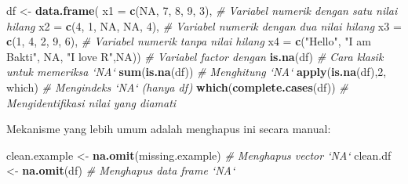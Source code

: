 \documentclass[
]{book}
\newenvironment{Shaded}{\begin{snugshade}}{\end{snugshade}}
\newcommand{\CommentTok}[1]{\textcolor[rgb]{0.56,0.35,0.01}{\textit{#1}}}
\newcommand{\DataTypeTok}[1]{\textcolor[rgb]{0.13,0.29,0.53}{#1}}
\newcommand{\DecValTok}[1]{\textcolor[rgb]{0.00,0.00,0.81}{#1}}
\newcommand{\KeywordTok}[1]{\textcolor[rgb]{0.13,0.29,0.53}{\textbf{#1}}}
\newcommand{\NormalTok}[1]{#1}
\newcommand{\OtherTok}[1]{\textcolor[rgb]{0.56,0.35,0.01}{#1}}
\newcommand{\StringTok}[1]{\textcolor[rgb]{0.31,0.60,0.02}{#1}}
\begin{document}
\begin{Shaded}
\begin{Highlighting}[]
\NormalTok{df <-}\StringTok{ }\KeywordTok{data.frame}\NormalTok{( }\DataTypeTok{x1 =} \KeywordTok{c}\NormalTok{(}\OtherTok{NA}\NormalTok{, }\DecValTok{7}\NormalTok{, }\DecValTok{8}\NormalTok{, }\DecValTok{9}\NormalTok{, }\DecValTok{3}\NormalTok{),         }\CommentTok{# Variabel numerik dengan satu nilai hilang}
                  \DataTypeTok{x2 =} \KeywordTok{c}\NormalTok{(}\DecValTok{4}\NormalTok{, }\DecValTok{1}\NormalTok{, }\OtherTok{NA}\NormalTok{, }\OtherTok{NA}\NormalTok{, }\DecValTok{4}\NormalTok{),        }\CommentTok{# Variabel numerik dengan dua nilai hilang}
                  \DataTypeTok{x3 =} \KeywordTok{c}\NormalTok{(}\DecValTok{1}\NormalTok{, }\DecValTok{4}\NormalTok{, }\DecValTok{2}\NormalTok{, }\DecValTok{9}\NormalTok{, }\DecValTok{6}\NormalTok{),          }\CommentTok{# Variabel numerik tanpa nilai hilang}
                  \DataTypeTok{x4 =} \KeywordTok{c}\NormalTok{(}\StringTok{"Hello"}\NormalTok{, }\StringTok{"I am Bakti"}\NormalTok{, }
                         \OtherTok{NA}\NormalTok{, }\StringTok{"I love R"}\NormalTok{,}\OtherTok{NA}\NormalTok{))      }\CommentTok{# Variabel factor dengan}
\KeywordTok{is.na}\NormalTok{(df)                                         }\CommentTok{# Cara klasik untuk memeriksa `NA`}
\KeywordTok{sum}\NormalTok{(}\KeywordTok{is.na}\NormalTok{(df))                                    }\CommentTok{# Menghitung `NA`}
\KeywordTok{apply}\NormalTok{(}\KeywordTok{is.na}\NormalTok{(df),}\DecValTok{2}\NormalTok{, which)                         }\CommentTok{# Mengindeks `NA` (hanya df)}
\KeywordTok{which}\NormalTok{(}\KeywordTok{complete.cases}\NormalTok{(df))                         }\CommentTok{# Mengidentifikasi nilai yang diamati}
\end{Highlighting}
\end{Shaded}

Mekanisme yang lebih umum adalah menghapus ini secara manual:

\begin{Shaded}
\begin{Highlighting}[]
\NormalTok{clean.example <-}\StringTok{ }\KeywordTok{na.omit}\NormalTok{(missing.example)         }\CommentTok{# Menghapus vector `NA`}
\NormalTok{clean.df <-}\StringTok{ }\KeywordTok{na.omit}\NormalTok{(df)                           }\CommentTok{# Menghapus data frame `NA`}
\end{Highlighting}
\end{Shaded}
\end{document}
